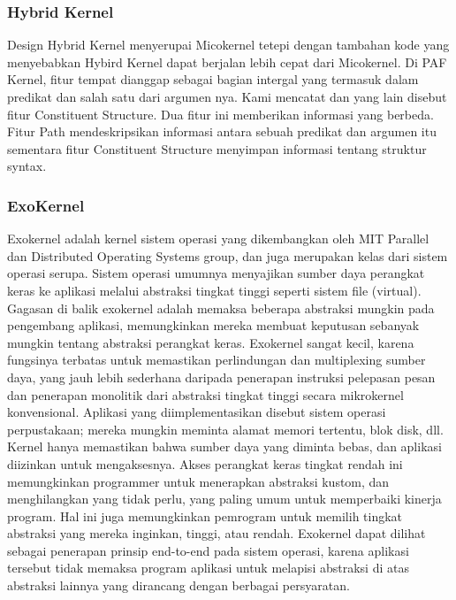 			\subsubsection{Hybrid Kernel}
			 Design Hybrid Kernel menyerupai Micokernel tetepi dengan tambahan kode yang menyebabkan Hybird Kernel dapat berjalan lebih cepat dari Micokernel. 
			 Di PAF Kernel, fitur tempat dianggap sebagai bagian intergal yang termasuk dalam predikat dan salah satu dari argumen nya. Kami mencatat dan yang lain disebut fitur 
			 Constituent Structure. Dua fitur ini memberikan informasi yang berbeda. Fitur Path mendeskripsikan informasi antara sebuah predikat dan argumen itu sementara fitur 
			 Constituent Structure menyimpan informasi tentang struktur syntax.
	
			\subsubsection{ExoKernel}
			 Exokernel adalah kernel sistem operasi yang dikembangkan oleh MIT Parallel dan Distributed Operating Systems group, dan juga merupakan kelas dari sistem operasi serupa.
			 Sistem operasi umumnya menyajikan sumber daya perangkat keras ke aplikasi melalui abstraksi tingkat tinggi seperti sistem file (virtual). Gagasan di balik exokernel adalah 
			 memaksa beberapa abstraksi mungkin pada pengembang aplikasi, memungkinkan mereka membuat keputusan sebanyak mungkin tentang abstraksi perangkat keras. Exokernel sangat kecil, 
			 karena fungsinya terbatas untuk memastikan perlindungan dan multiplexing sumber daya, yang jauh lebih sederhana daripada penerapan instruksi pelepasan pesan dan penerapan 
			 monolitik dari abstraksi tingkat tinggi secara mikrokernel konvensional.
			 Aplikasi yang diimplementasikan disebut sistem operasi perpustakaan; mereka mungkin meminta alamat memori tertentu, blok disk, dll. Kernel hanya memastikan bahwa sumber 
			 daya yang diminta bebas, dan aplikasi diizinkan untuk mengaksesnya. Akses perangkat keras tingkat rendah ini memungkinkan programmer untuk menerapkan abstraksi kustom, dan 
			 menghilangkan yang tidak perlu, yang paling umum untuk memperbaiki kinerja program. Hal ini juga memungkinkan pemrogram untuk memilih tingkat abstraksi yang mereka inginkan, tinggi, atau rendah.
			 Exokernel dapat dilihat sebagai penerapan prinsip end-to-end pada sistem operasi, karena aplikasi tersebut tidak memaksa program aplikasi untuk melapisi abstraksi di atas abstraksi 
			 lainnya yang dirancang dengan berbagai persyaratan.
			
